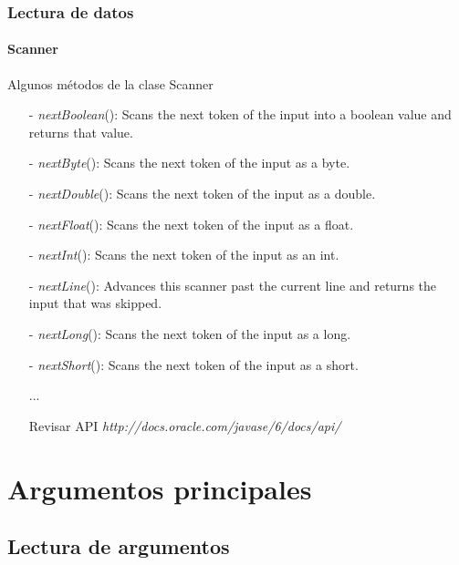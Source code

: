 \documentclass{beamer}
\begin{document}
        \begin{frame}
			\frametitle{Lectura de datos}
			\framesubtitle{Scanner}

            \begin{block}{Algunos m\'etodos de la clase Scanner}
				{\scriptsize
				    \begin{itemize}
                        \item[-] \emph{nextBoolean}(): Scans the next token of the input into a boolean value and returns that value.
                        \item[-] \emph{nextByte}(): Scans the next token of the input as a byte.
                        \item[-] \emph{nextDouble}(): Scans the next token of the input as a double.
                        \item[-] \emph{nextFloat}(): Scans the next token of the input as a float.
                        \item[-] \emph{nextInt}(): Scans the next token of the input as an int.
                        \item[-] \emph{nextLine}(): Advances this scanner past the current line and returns the input that was skipped.
                        \item[-] \emph{nextLong}(): Scans the next token of the input as a long.
                        \item[-] \emph{nextShort}(): Scans the next token of the input as a short.
                        \item[ ] ...
                        \item[ ] Revisar API \emph{http://docs.oracle.com/javase/6/docs/api/}
                    \end{itemize}
				}
			\end{block}
		\end{frame}	

    \section{Argumentos principales}
    
		\subsection{Lectura de argumentos}
		
\end{document}
